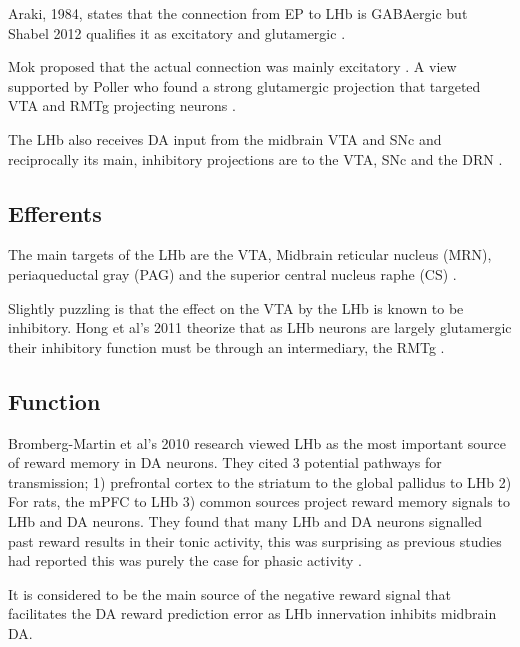 \documentclass[12pt,a4paper]{article}
\begin{document}
Araki, 1984, states that the connection from EP to LHb is GABAergic \citep{Araki1984} but Shabel 2012 qualifies it as excitatory and glutamergic \citep{Shabel2012}.

Mok proposed that the actual connection was mainly excitatory \citep{Mok1974}. A view supported by Poller who found a strong glutamergic projection that targeted VTA and RMTg projecting neurons \citep{Poller2013}.

The LHb also receives DA input from the midbrain VTA and SNc \citep{Kowski2009} and reciprocally its main, inhibitory projections are to the VTA, SNc and the DRN \citep{Ji2007}\citep{Christoph1986}\citep{Rajakumar1993}.

\subsection{Efferents}

The main targets of the LHb are the VTA, Midbrain reticular nucleus (MRN), periaqueductal gray (PAG) and the superior central nucleus raphe (CS) \citep{Quina2015}.

Slightly puzzling is that the effect on the VTA by the LHb is known to be inhibitory. Hong et al’s 2011 theorize that as LHb neurons are largely glutamergic their inhibitory function must be through an intermediary, the RMTg \citep{Hong2011}.

\subsection{Function}

Bromberg-Martin et al’s 2010 research viewed LHb as the most important source of reward memory in DA neurons. They cited 3 potential pathways for transmission; 1) prefrontal cortex to the striatum to the global pallidus to LHb 2) For rats, the mPFC to LHb 3) common sources project reward memory signals to LHb and DA neurons. They found that many LHb and DA neurons signalled past reward results in their tonic activity, this was surprising as previous studies had reported this was purely the case for phasic activity \citep{Bromberg-Martin2010}.

It is considered to be the main source of the negative reward signal that facilitates the DA reward prediction error as LHb innervation inhibits midbrain DA.\citep{Shen2012}\citep{Shabel2012}\citep{Matsumoto2007}\citep{Barrot2012} 
\end{document}
